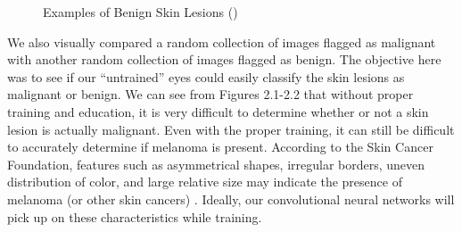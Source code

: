 \documentclass [MAS] {uclathes}
\begin{document}
\begin{figure}[hbt!]
\hspace*{\fill}
\centering
{}\hspace{0.5em}
\hspace{0.5em}
\hspace*{\fill}
\label{fig:ben_examples}
\vspace{-1cm}
\caption{Examples of Benign Skin Lesions (\cite{ISIC})}
\end{figure}


We also visually compared a random collection of images flagged as malignant with another random collection of images flagged as benign. The objective here was to see if our ``untrained'' eyes could easily classify the skin lesions as malignant or benign. We can see from Figures 2.1-2.2 that without proper training and education, it is very difficult to determine whether or not a skin lesion is actually malignant. Even with the proper training, it can still be difficult to accurately determine if melanoma is present. According to the Skin Cancer Foundation, features such as asymmetrical shapes, irregular borders, uneven distribution of color, and large relative size may indicate the presence of melanoma (or other skin cancers) \cite{SCF}. Ideally, our convolutional neural networks will pick up on these characteristics while training.
\end{document}
